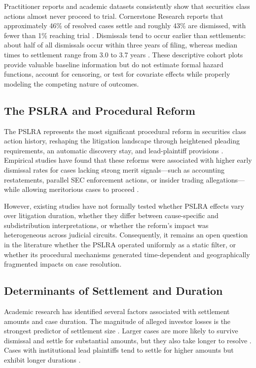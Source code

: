 Practitioner reports and academic datasets consistently show
that securities class actions almost never proceed to trial.
Cornerstone Research reports that approximately 46\% of resolved
cases settle and roughly 43\% are dismissed, with fewer than
1\% reaching trial \citep{cornerstone2022}. Dismissals tend to
occur earlier than settlements: about half of all dismissals
occur within three years of filing, whereas median times to
settlement range from 3.0 to 3.7 years \citep{cornerstone2024}.
These descriptive cohort plots provide valuable baseline
information but do not estimate formal hazard functions, account
for censoring, or test for covariate effects while properly
modeling the competing nature of outcomes.

\subsection{The PSLRA and Procedural Reform}

The PSLRA represents the most significant procedural reform in
securities class action history, reshaping the litigation
landscape through heightened pleading requirements, an
automatic discovery stay, and lead-plaintiff provisions
\citep{johnson2001}. Empirical studies have found that these
reforms were associated with higher early dismissal rates for
cases lacking strong merit signals---such as accounting
restatements, parallel SEC enforcement actions, or insider
trading allegations---while allowing meritorious cases to
proceed \citep{johnson2001, choi2007}.

However, existing studies have not formally tested whether PSLRA 
effects vary over litigation duration, whether they differ between
cause-specific and subdistribution interpretations, or whether
the reform's impact was heterogeneous across judicial circuits.
Consequently, it remains an open question in the literature 
whether the PSLRA operated uniformly as a static filter, or 
whether its procedural mechanisms generated time-dependent and 
geographically fragmented impacts on case resolution.

\subsection{Determinants of Settlement and Duration}

Academic research has identified several factors associated
with settlement amounts and case duration. The magnitude of
alleged investor losses is the strongest predictor of
settlement size \citep{cox2008}. Larger cases are more likely
to survive dismissal and settle for substantial amounts, but
they also take longer to resolve \citep{cornerstone2024}.
Cases with institutional lead plaintiffs tend to settle for
higher amounts but exhibit longer durations
\citep{cheng2010, cox2008}.

